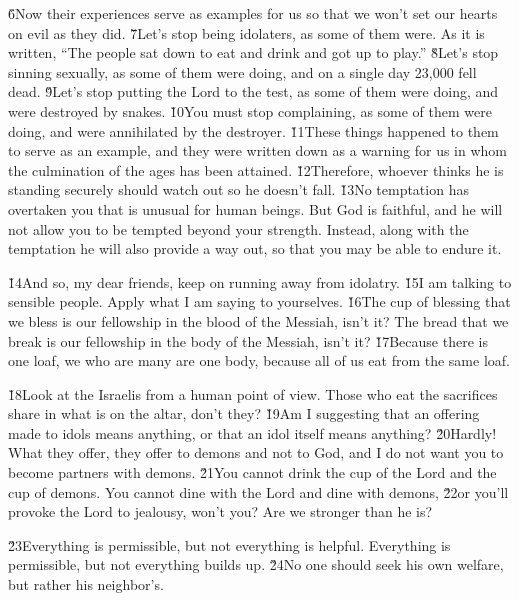 \v{6}Now their experiences serve as examples for us so that we won't set our hearts on evil as they did. \v{7}Let's stop being idolaters, as some of them were. As it is written, ``The people sat down to eat and drink and got up to play.'' \v{8}Let's stop sinning sexually, as some of them were doing, and on a single day 23,000 fell dead. \v{9}Let's stop putting the Lord to the test, as some of them were doing, and were destroyed by snakes. \v{10}You must stop complaining, as some of them were doing, and were annihilated by the destroyer. \v{11}These things happened to them to serve as an example, and they were written down as a warning for us in whom the culmination of the ages has been attained. \v{12}Therefore, whoever thinks he is standing securely should watch out so he doesn't fall. \v{13}No temptation has overtaken you that is unusual for human beings. But God is faithful, and he will not allow you to be tempted beyond your strength. Instead, along with the temptation he will also provide a way out, so that you may be able to endure it.

\v{14}And so, my dear friends, keep on running away from idolatry. \v{15}I am talking to sensible people. Apply what I am saying to yourselves. \v{16}The cup of blessing that we bless is our fellowship in the blood of the Messiah, isn't it? The bread that we break is our fellowship in the body of the Messiah, isn't it? \v{17}Because there is one loaf, we who are many are one body, because all of us eat from the same loaf.

\v{18}Look at the Israelis from a human point of view. Those who eat the sacrifices share in what is on the altar, don't they? \v{19}Am I suggesting that an offering made to idols means anything, or that an idol itself means anything? \v{20}Hardly! What they offer, they offer to demons and not to God, and I do not want you to become partners with demons. \v{21}You cannot drink the cup of the Lord and the cup of demons. You cannot dine with the Lord and dine with demons, \v{22}or you'll provoke the Lord to jealousy, won't you? Are we stronger than he is?

\v{23}Everything is permissible, but not everything is helpful. Everything is permissible, but not everything builds up. \v{24}No one should seek his own welfare, but rather his neighbor's.

